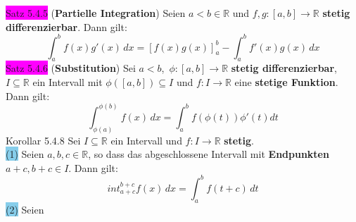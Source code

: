 \documentclass[landscape, 10pt]{article}
\newcommand{\R}{\mathbb{R}}
\begin{document}
\begin{multicols}{3}
\begin{equation*}
                     \end{equation*}
              \colorbox{magenta}{Satz 5.4.5} 
              (\textbf{Partielle Integration}) 
                     Seien \textcolor{NavyBlue}{$a<b\in\R$} und 
                     \textcolor{NavyBlue}{
                     $f,g:[a,b]\longrightarrow\R$}
                     \textbf{stetig differenzierbar}. Dann gilt:
                     \begin{equation*}
                            \int_a^bf(x)g'(x)\,dx
                            =[f(x)g(x)]_a^b
                            -\int_a^bf'(x)g(x)\,dx
                     \end{equation*}
              \colorbox{magenta}{Satz 5.4.6} 
              (\textbf{Substitution}) 
                     Sei \textcolor{NavyBlue}{$a<b$},\,
                     \textcolor{NavyBlue}{
                     $\phi:[a,b]\longrightarrow\R$}
                     \textbf{stetig differenzierbar}, 
                     \textcolor{NavyBlue}{$I\subseteq\R$}
                     ein Intervall mit 
                     \textcolor{NavyBlue}{
                     $\phi([a,b])\subseteq I$}
                     und \textcolor{NavyBlue}{
                     $f:I\longrightarrow\R$} eine 
                     \textbf{stetige Funktion}. Dann gilt:
                     \begin{equation*}
                            \int_{\phi(a)}^{\phi(b)}f(x)\,dx
                            =\int_a^bf(\phi(t))\phi'(t)dt
                     \end{equation*}
              \colorbox{BurntOrange}{Korollar 5.4.8} 
                     Sei \textcolor{NavyBlue}{$I\subseteq\R$}
                     ein Intervall und \textcolor{NavyBlue}{
                     $f:I\longrightarrow\R$} 
                     \textbf{stetig}. \\
                     \colorbox{SkyBlue}{(1)} Seien 
                            \textcolor{NavyBlue}{$a,b,c\in\R$}, 
                            so dass das abgeschlossene Intervall 
                            mit \textbf{Endpunkten} 
                            \textcolor{NavyBlue}{$a+c,b+c\in I$}. 
                            Dann gilt: 
                            \begin{equation*}
                                   int_{a+c}^{b+c}f(x)\,dx
                                   =\int_a^bf(t+c)\,dt
                            \end{equation*}
                     \colorbox{SkyBlue}{(2)} 
                            Seien \textcolor{NavyBlue}{
}
\end{multicols}
\end{document}
